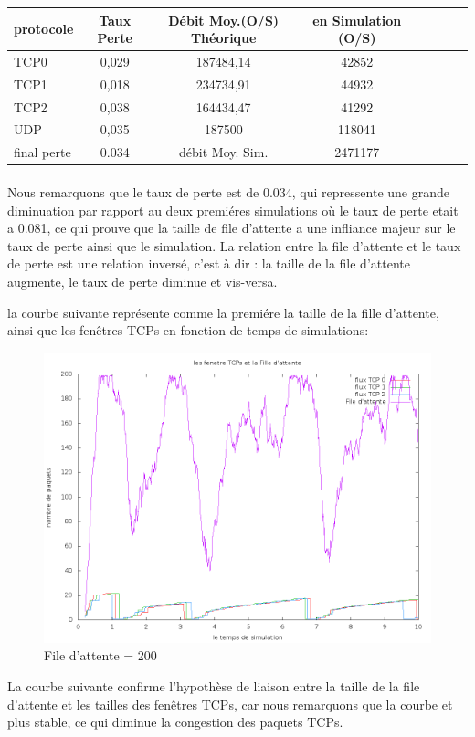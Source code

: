 \documentclass[a4paper]{report}
\theoremstyle{definition}
\begin{document}
\begin{tabular}{|l|c|c|c|c|c|c|c|}
\hline
 protocole & Taux Perte & Débit Moy.(O/S) Théorique & en Simulation (O/S) \\ \hline
 TCP0 & 0,029 &  187484,14 &  42852     \\
 TCP1 & 0,018 &  234734,91 &  44932     \\ 
 TCP2 & 0,038 &  164434,47 &  41292     \\ 
 UDP  & 0,035 &  187500    &  118041 \\ 
 \hline
 final perte & 0.034  & débit Moy. Sim. & 2471177   \\ 
\hline

\end{tabular}
\paragraph{} Nous remarquons que le taux de perte est de 0.034, qui repressente une grande diminuation par rapport au deux premiéres simulations où le taux de perte etait a 0.081, ce qui prouve que la taille de file d'attente a une infliance majeur sur le taux de perte ainsi que le simulation.
        La relation entre la file d'attente et le taux de perte est une relation inversé, c'est à dir : la taille de la file d'attente augmente, le taux de perte diminue et vis-versa.
	
	la courbe suivante représente comme la premiére la taille de la fille d'attente, ainsi que les fenêtres TCPs en fonction de temps de simulations:
\newpage
\begin{center}

\begin{figure}[h]
	\centering
		\includegraphics[width=450px]{graphic/f200w20.png}
		\caption{File d'attente = 200}
\end{figure}
\end{center}
	La courbe suivante confirme l'hypothèse de liaison entre la taille de la file d'attente et les tailles des fenêtres TCPs, car nous remarquons que la courbe et plus stable, ce qui diminue la congestion des paquets TCPs.          
\end{document}
